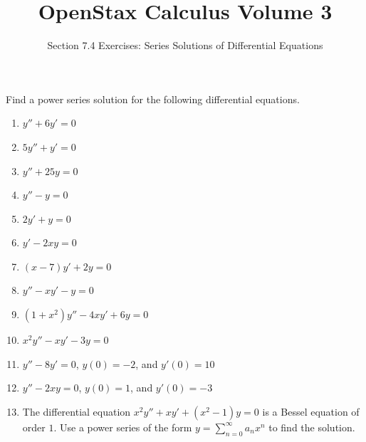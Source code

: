 \documentclass{exercises}
\title{OpenStax Calculus Volume 3}
\subtitle{Section 7.4 Exercises: Series Solutions of Differential Equations}
\author{}
\date{}
\begin{document}
\maketitle


Find a power series solution for the following differential equations.

\begin{enumerate}[start=1]
\item $y''+6y'=0$
\item $5y''+y'=0$
\item $y''+25y=0$
\item $y''-y=0$
\item $2y'+y=0$
\item $y'-2xy=0$
\item $(x-7)y'+2y=0$
\item $y''-xy'-y=0$
\item $(1+x^{2})y''-4xy'+6y=0$
\item $x^{2}y''-xy'-3y=0$
\item $y''-8y'=0$, $y(0)=-2$, and $y'(0)=10$
\item $y''-2xy=0$, $y(0)=1$, and $y'(0)=-3$
\item The differential equation $x^{2}y''+xy'+(x^{2}-1)y=0$ is a Bessel equation of order $1$. Use a power series of the form $y=\sum_{n=0}^{\infty}a_{n}x^{n}$ to find the solution.
\end{enumerate}
\end{document}
